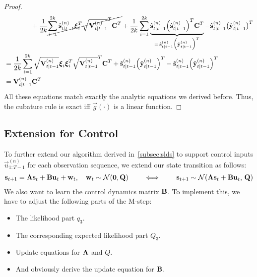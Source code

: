\begin{proof}
\begin{align*}
						&\qquad\qquad + \frac{1}{2k} \cancel{\sum_{i = 1}^{2k} \hat{\boldsymbol{\mathrm{s}}}_{t \vert t - 1}^{(n)} \boldsymbol{\mathrm{\xi}}_i^T \sqrt{\boldsymbol{\mathrm{V}}_{t \vert t - 1}^{(n)}}^T \boldsymbol{\mathrm{C}}^T} + \frac{1}{2k} \sum_{i = 1}^{2k} \underbrace{\hat{\boldsymbol{\mathrm{s}}}_{t \vert t - 1}^{(n)} \Big(\hat{\boldsymbol{\mathrm{s}}}_{t \vert t - 1}^{(n)}\Big)^T \boldsymbol{\mathrm{C}}^T}_{=\, \hat{\boldsymbol{\mathrm{s}}}_{t \vert t - 1}^{(n)} \Big( \hat{\boldsymbol{\mathrm{y}}}_{t \vert t - 1}^{(n)} \Big)^T} - \hat{\boldsymbol{\mathrm{s}}}_{t \vert t - 1}^{(n)} \big( \hat{\boldsymbol{\mathrm{y}}}_{t \vert t - 1}^{(n)} \big)^T \\
					&= \frac{1}{2k} \sum_{i = 1}^{2k} \sqrt{\boldsymbol{\mathrm{V}}_{t \vert t - 1}^{(n)}} \boldsymbol{\mathrm{\xi}}_i \boldsymbol{\mathrm{\xi}}_i^T \sqrt{\boldsymbol{\mathrm{V}}_{t \vert t - 1}^{(n)}}^T \boldsymbol{\mathrm{C}}^T + \hat{\boldsymbol{\mathrm{s}}}_{t \vert t - 1}^{(n)} \Big( \hat{\boldsymbol{\mathrm{y}}}_{t \vert t - 1}^{(n)} \Big)^T - \hat{\boldsymbol{\mathrm{s}}}_{t \vert t - 1}^{(n)} \Big( \hat{\boldsymbol{\mathrm{y}}}_{t \vert t - 1}^{(n)} \Big)^T \\
					&= \boldsymbol{\mathrm{V}}_{t \vert t - 1}^{(n)} \boldsymbol{\mathrm{C}}^T
			\end{align*}
			All these equations match exactly the analytic equations we derived before. Thus, the cubature rule is exact iff \(\vec{g}(\cdot)\) is a linear function.
		\end{proof}

	\subsection{Extension for Control}
		To further extend our algorithm derived in~\autoref{subsec:slds} to support control inputs \( \vec{u}_{1:T - 1}^{(n)} \) for each observation sequence, we extend our state transition as follows:
		\begin{align*}
			\boldsymbol{\mathrm{s}}_{t + 1} = \boldsymbol{\mathrm{A}} \boldsymbol{\mathrm{s}}_t + \boldsymbol{\mathrm{B}} \boldsymbol{\mathrm{u}}_t + \boldsymbol{\mathrm{w}}_t,\quad \boldsymbol{\mathrm{w}}_t \sim \mathcal{N}(\boldsymbol{\mathrm{0}}, \boldsymbol{\mathrm{Q}})
			\qquad\iff\qquad
			\boldsymbol{\mathrm{s}}_{t + 1} \sim \mathcal{N}(\boldsymbol{\mathrm{A}} \boldsymbol{\mathrm{s}}_t + \boldsymbol{\mathrm{B}} \boldsymbol{\mathrm{u}}_t,\, \boldsymbol{\mathrm{Q}})
		\end{align*}
		We also want to learn the control dynamics matrix \(\boldsymbol{\mathrm{B}}\). To implement this, we have to adjust the following parts of the M-step:
		\begin{itemize}
			\item The likelihood part \(q_3\).
			\item The corresponding expected likelihood part \(Q_3\).
			\item Update equations for \(\boldsymbol{\mathrm{A}}\) and \(Q\).
			\item And obviously derive the update equation for \(\boldsymbol{\mathrm{B}}\).
		\end{itemize}

